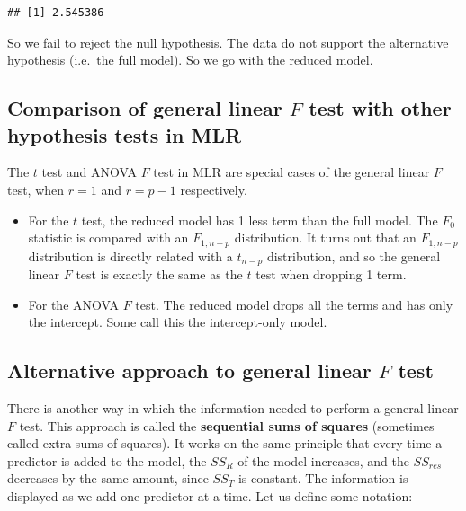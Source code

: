 \documentclass[
]{book}
\begin{document}
\begin{verbatim}
## [1] 2.545386
\end{verbatim}

So we fail to reject the null hypothesis. The data do not support the alternative hypothesis (i.e.~the full model). So we go with the reduced model.

\hypertarget{comparison-of-general-linear-f-test-with-other-hypothesis-tests-in-mlr}{%
\subsection{\texorpdfstring{Comparison of general linear \(F\) test with other hypothesis tests in MLR}{Comparison of general linear F test with other hypothesis tests in MLR}}\label{comparison-of-general-linear-f-test-with-other-hypothesis-tests-in-mlr}}

The \(t\) test and ANOVA \(F\) test in MLR are special cases of the general linear \(F\) test, when \(r=1\) and \(r=p-1\) respectively.

\begin{itemize}
\item
  For the \(t\) test, the reduced model has 1 less term than the full model. The \(F_0\) statistic is compared with an \(F_{1,n-p}\) distribution. It turns out that an \(F_{1,n-p}\) distribution is directly related with a \(t_{n-p}\) distribution, and so the general linear \(F\) test is exactly the same as the \(t\) test when dropping 1 term.
\item
  For the ANOVA \(F\) test. The reduced model drops all the terms and has only the intercept. Some call this the intercept-only model.
\end{itemize}

\hypertarget{alternative-approach-to-general-linear-f-test}{%
\subsection{\texorpdfstring{Alternative approach to general linear \(F\) test}{Alternative approach to general linear F test}}\label{alternative-approach-to-general-linear-f-test}}

There is another way in which the information needed to perform a general linear \(F\) test. This approach is called the \textbf{sequential sums of squares} (sometimes called extra sums of squares). It works on the same principle that every time a predictor is added to the model, the \(SS_R\) of the model increases, and the \(SS_{res}\) decreases by the same amount, since \(SS_T\) is constant. The information is displayed as we add one predictor at a time. Let us define some notation:
\end{document}
